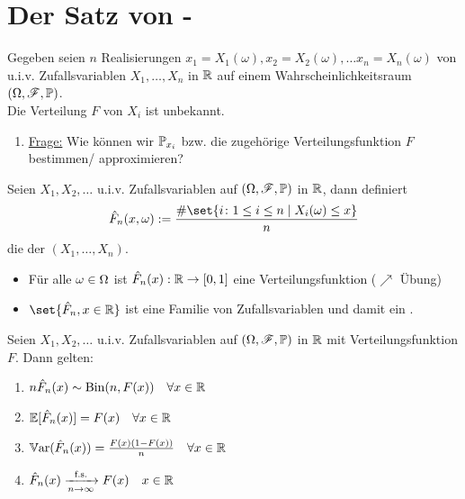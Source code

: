 \section{Der Satz von -}
Gegeben seien $n$ Realisierungen $x_1 = X_1(\omega), x_2 = X_2(\omega), \dots x_n = X_n(\omega)$ von u.i.v. Zufallsvariablen $X_1,\dots, X_n$ in $\R$ auf einem Wahrscheinlichkeitsraum $(\O, \F, \P)$.\\
Die Verteilung $F$ von $X_i$ ist unbekannt.
\begin{enumerate}[label=]
	\item \ul{Frage:} Wie können wir $\P_{x_i}$ bzw. die zugehörige Verteilungsfunktion $F$ bestimmen/ approximieren?
\end{enumerate}
\begin{definition}
	Seien $X_1,X_2, \dots$ u.i.v. Zufallsvariablen auf $(\O,\F,\P)$ in $\R$, dann definiert
	\begin{align*}
		\hat{F}_n(x,\omega) := \frac{\# \set{ i\colon 1 \le i \le n \mid X_i(\omega) \le x}}{n}
	\end{align*}
	die  der  $(X_1, \dots, X_n)$.
\end{definition}
\begin{*remark}
	\begin{itemize}
		\item Für alle $\omega \in \O$ ist $\hat{F}_n(x): \R \to [0,1]$ eine Verteilungsfunktion ($\nearrow$ Übung)
		\item $\set{\hat{F}_n, x \in \R}$ ist eine Familie von Zufallsvariablen und damit ein .
	\end{itemize}
\end{*remark}
\begin{proposition}
	 Seien $X_1, X_2, \dots$ u.i.v. Zufallsvariablen auf $(\O,\F,\P)$ in $\R$ mit Verteilungsfunktion $F$. Dann gelten:
	\begin{enumerate}
		\item $n \hat{F}_n(x) \sim \Bin(n,F(x)) \quad \forall x\in \R$
		\item $\E[\hat{F}_n(x)] = F(x) \quad \forall x \in \R$
		\item $\Var(\hat{F}_n(x)) = \frac{F(x)(1-F(x))}{n} \quad \forall x \in \R$
		\item $\hat{F}_n(x) \xrightarrow[n \to \infty]{\text{f.s.}} F(x) \quad x \in \R$
	\end{enumerate}
\end{proposition}
